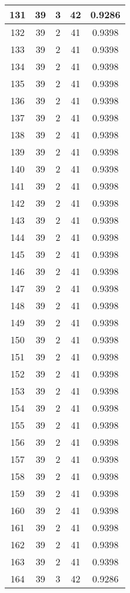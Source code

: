 \documentclass[letterpaper, 12pt]{article}
\begin{document}
\begin{longtable}{|c|c|c|c|c|}
\hline
131 & 39 & 3 & 42 & 0.9286 \\
\hline
132 & 39 & 2 & 41 & 0.9398 \\
\hline
133 & 39 & 2 & 41 & 0.9398 \\
\hline
134 & 39 & 2 & 41 & 0.9398 \\
\hline
135 & 39 & 2 & 41 & 0.9398 \\
\hline
136 & 39 & 2 & 41 & 0.9398 \\
\hline
137 & 39 & 2 & 41 & 0.9398 \\
\hline
138 & 39 & 2 & 41 & 0.9398 \\
\hline
139 & 39 & 2 & 41 & 0.9398 \\
\hline
140 & 39 & 2 & 41 & 0.9398 \\
\hline
141 & 39 & 2 & 41 & 0.9398 \\
\hline
142 & 39 & 2 & 41 & 0.9398 \\
\hline
143 & 39 & 2 & 41 & 0.9398 \\
\hline
144 & 39 & 2 & 41 & 0.9398 \\
\hline
145 & 39 & 2 & 41 & 0.9398 \\
\hline
146 & 39 & 2 & 41 & 0.9398 \\
\hline
147 & 39 & 2 & 41 & 0.9398 \\
\hline
148 & 39 & 2 & 41 & 0.9398 \\
\hline
149 & 39 & 2 & 41 & 0.9398 \\
\hline
150 & 39 & 2 & 41 & 0.9398 \\
\hline
151 & 39 & 2 & 41 & 0.9398 \\
\hline
152 & 39 & 2 & 41 & 0.9398 \\
\hline
153 & 39 & 2 & 41 & 0.9398 \\
\hline
154 & 39 & 2 & 41 & 0.9398 \\
\hline
155 & 39 & 2 & 41 & 0.9398 \\
\hline
156 & 39 & 2 & 41 & 0.9398 \\
\hline
157 & 39 & 2 & 41 & 0.9398 \\
\hline
158 & 39 & 2 & 41 & 0.9398 \\
\hline
159 & 39 & 2 & 41 & 0.9398 \\
\hline
160 & 39 & 2 & 41 & 0.9398 \\
\hline
161 & 39 & 2 & 41 & 0.9398 \\
\hline
162 & 39 & 2 & 41 & 0.9398 \\
\hline
163 & 39 & 2 & 41 & 0.9398 \\
\hline
164 & 39 & 3 & 42 & 0.9286 \\

\end{longtable}
\end{document}
